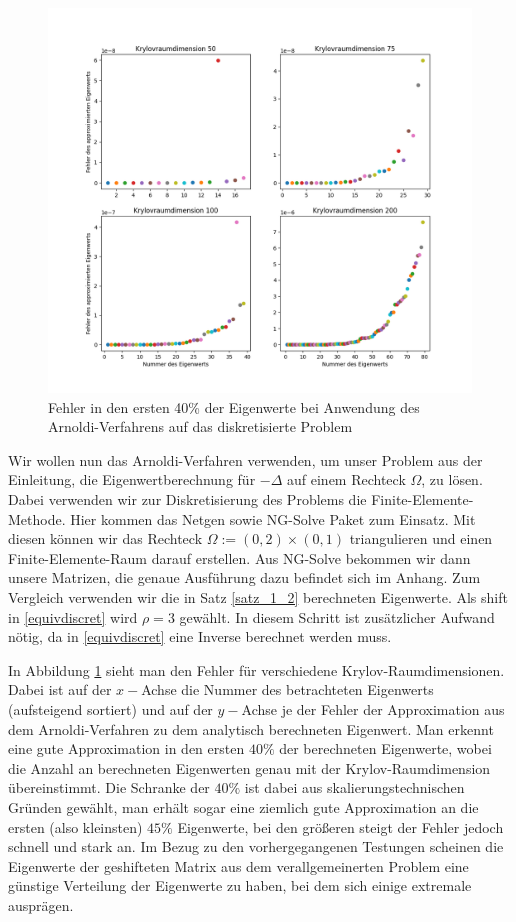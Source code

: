 \documentclass{article}
\theoremstyle{plain}
\begin{document}
\begin{figure}
	\centering
	\includegraphics[width = 0.9\linewidth]{Plots/error_eigv_laplace}
	\caption{Fehler in den ersten 40\% der Eigenwerte bei Anwendung des Arnoldi-Verfahrens auf das diskretisierte Problem}
	\label{error_eigv_laplace}
\end{figure}

Wir wollen nun das Arnoldi-Verfahren verwenden, um unser Problem aus der Einleitung, die Eigenwertberechnung für $-\Delta$ auf einem Rechteck $\Omega$, zu lösen. Dabei verwenden wir zur Diskretisierung des Problems die Finite-Elemente-Methode. Hier kommen das Netgen sowie NG-Solve Paket zum Einsatz. Mit diesen können wir das Rechteck $\Omega := (0,2) \times (0,1)$ triangulieren und einen Finite-Elemente-Raum darauf erstellen. Aus NG-Solve bekommen wir dann unsere Matrizen, die genaue Ausführung dazu befindet sich im Anhang. Zum Vergleich verwenden wir die in Satz \ref{satz_1_2} berechneten Eigenwerte. Als shift in \eqref{equivdiscret} wird $\rho = 3$ gewählt. In diesem Schritt ist zusätzlicher Aufwand nötig, da in \eqref{equivdiscret} eine Inverse berechnet werden muss.

\newpage
 In Abbildung \ref{error_eigv_laplace} sieht man den Fehler für verschiedene Krylov-Raumdimensionen. Dabei ist auf der $x-$Achse die Nummer des betrachteten Eigenwerts (aufsteigend sortiert) und auf der $y-$Achse je der Fehler der Approximation aus dem Arnoldi-Verfahren zu dem analytisch berechneten Eigenwert.
 Man erkennt eine gute Approximation in den ersten $40\%$ der berechneten Eigenwerte, wobei die Anzahl an berechneten Eigenwerten genau mit der Krylov-Raumdimension übereinstimmt. Die Schranke der $40\%$ ist dabei aus skalierungstechnischen Gründen gewählt, man erhält sogar eine ziemlich gute Approximation an die ersten (also kleinsten) $45\%$ Eigenwerte, bei den größeren steigt der Fehler jedoch schnell und stark an. Im Bezug zu den vorhergegangenen Testungen scheinen die Eigenwerte der geshifteten Matrix aus dem verallgemeinerten Problem eine günstige Verteilung der Eigenwerte zu haben, bei dem sich einige extremale ausprägen.
\end{document}
